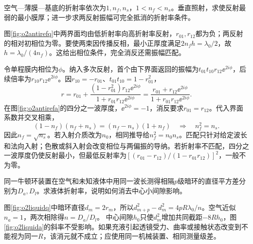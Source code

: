 \begin{exercise}\label{ex:o2filmindex}
空气—薄膜—基底的折射率依次为$1,n_f,n_s$，$1<n_f<n_s$。垂直照射，求使反射最弱的最小膜厚；进一步求两反射振幅可完全抵消的折射率条件。
\end{exercise}
\begin{solution}
图\ref{fig:o2antirefq}中两界面均由低折射率向高折射率反射，$r_{01},r_{12}$都为负；两反射的相对初相位为零。要使两束因传播反相，最小正厚度满足$2n_fh=\lambda_0/2$，故$h=\lambda_0/(4n_f)$。这给出相位条件，完全消反还需振幅匹配。

令单程膜内相位为$\phi$。纳入多次反射，首个由下界面返回的振幅为$t_{01}t_{10}r_{12}\ee^{2i\phi}$，后续倍率为$r_{10}r_{12}\ee^{2i\phi}$。因$r_{10}=-r_{01}$、$t_{01}t_{10}=1-r_{01}^2$，
\[
 r=r_{01}+\frac{(1-r_{01}^2)r_{12}\ee^{2i\phi}}
 {1+r_{01}r_{12}\ee^{2i\phi}}
 =\frac{r_{01}+r_{12}\ee^{2i\phi}}{1+r_{01}r_{12}\ee^{2i\phi}}.
\]
在图\ref{fig:o2antirefa}的四分之一波厚度，$\ee^{2i\phi}=-1$，消反要求$r_{01}=r_{12}$。代入界面系数并交叉相乘，
\[
 (1-n_f)(n_f+n_s)=(n_f-n_s)(1+n_f)
 \quad\Longrightarrow\quad n_f^2=n_s.
\]
因此$n_f=\sqrt{n_s}$。若入射介质改为$n_0$，相同推导给$n_f^2=n_0n_s$。匹配只针对给定波长和法向入射；色散或斜入射会改变相位与两偏振的导纳。若折射率不匹配，四分之一波厚度仍使反射最小，但最低反射率为$[(r_{01}-r_{12})/(1-r_{01}r_{12})]^2$，一般不为零。
\end{solution}

\begin{exercise}\label{ex:o2ringliquid}
同一牛顿环装置在空气和未知液体中用同一波长测得相隔$p$级暗环的直径平方差分别为$D_a,D_l$。求液体折射率，说明如何消去中心小间隙影响。
\end{exercise}
\begin{solution}
图\ref{fig:o2liquidq}中暗环直径$d_m=2r_m$，所以$d_{m+p}^2-d_m^2=4pR\lambda_0/n$。空气近似$n_a=1$，两次相除得$n=D_a/D_l$。
中心间隙$h_0$只使$d_m^2$增加共同截距$-8Rh_0$，图\ref{fig:o2liquida}的斜率不受影响。如果充液引起透镜受力、曲率或接触状态改变到不能视为同一$R$，该消元就不成立；应使用同一机械装置、相同测量级差。
\end{solution}

